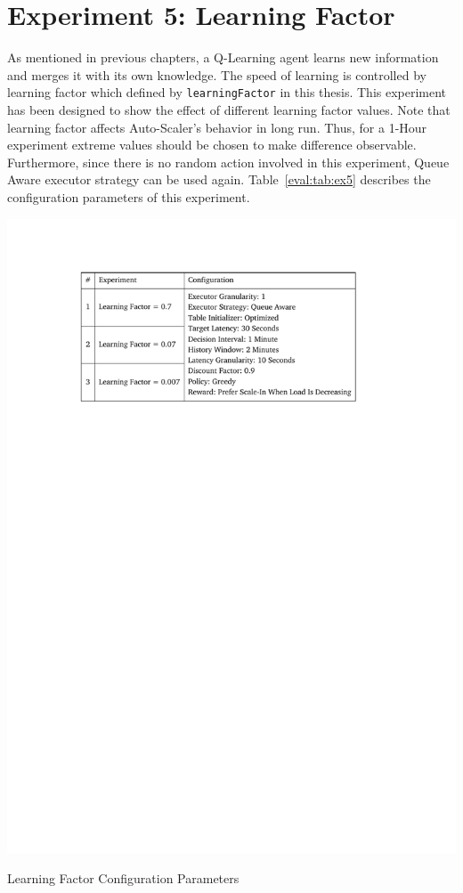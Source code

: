 \section{Experiment 5: Learning Factor}
As mentioned in previous chapters, a Q-Learning agent learns new information and merges it with its own knowledge. The speed of learning is controlled by learning factor which defined by \lstinline|learningFactor| in this thesis. This experiment has been designed to show the effect of different learning factor values. Note that learning factor affects Auto-Scaler's behavior in long run. Thus, for a 1-Hour experiment extreme values should be chosen to make difference observable. Furthermore, since there is no random action involved in this experiment, Queue Aware executor strategy can be used again. Table~\ref{eval:tab:ex5} describes the configuration parameters of this experiment. 
\begin{table}[h]
    \includegraphics[clip,trim=3.3cm 21.18cm 4.5cm 2.5cm]{tables/ex5.pdf}
    \centering
    \caption{Learning Factor Configuration Parameters}
    \label{eval:tab:ex5}
\end{table}

